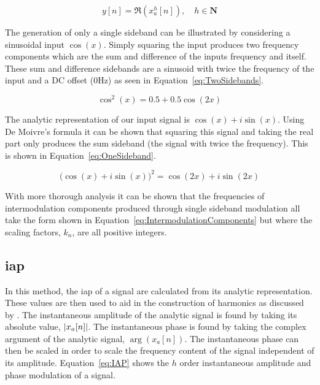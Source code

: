 		\begin{equation}
			y[n] = \Re \left( x_{a}^{h}[n] \right), \quad h \in \textbf{N}
			\label{eq:SSB}
		\end{equation}

		The generation of only a single sideband can be illustrated by considering a sinusoidal input $\cos(x)$.
		Simply squaring the input produces two frequency components which are the sum and difference of the inputs
		frequency and itself. These sum and difference sidebands are a sinusoid with twice the frequency of the
		input and a DC offset (0Hz) as seen in Equation~\ref{eq:TwoSidebands}.

		\begin{equation}
			\cos^{2}(x) = 0.5 + 0.5 \cos(2x)
			\label{eq:TwoSidebands}
		\end{equation}

		The analytic representation of our input signal is $\cos(x) + i\sin(x)$. Using De Moivre's formula it can
		be shown that squaring this signal and taking the real part only produces the sum sideband (the signal with
		twice the frequency). This is shown in Equation~\ref{eq:OneSideband}.

		\begin{equation}
			\bigl( \cos(x) + i\sin(x) \bigr)^{2} = \cos(2x) + i\sin(2x)
			\label{eq:OneSideband}
		\end{equation}

		With more thorough analysis it can be shown that the frequencies of intermodulation components produced
		through single sideband modulation all take the form shown in Equation~\ref{eq:IntermodulationComponents}
		but where the scaling factors, $k_{n}$, are all positive integers.

	\subsection{\acrlong{iap}}
	\label{sec:Excitation-Methods-IAP}
		In this method, the \acrfull{iap} of a signal are calculated from its analytic representation. These values
		are then used to aid in the construction of harmonics as discussed by \citet{puckette2007patch}. The
		instantaneous amplitude of the analytic signal is found by taking its absolute value, $\left|x_{a}[n]\right|$. The
		instantaneous phase is found by taking the complex argument of the analytic signal, $\arg(x_{a}[n])$. The
		instantaneous phase can then be scaled in order to scale the frequency content of the signal independent of
		its amplitude.  Equation~\ref{eq:IAP} shows the $h$ order instantaneous amplitude and phase
		modulation of a signal.

